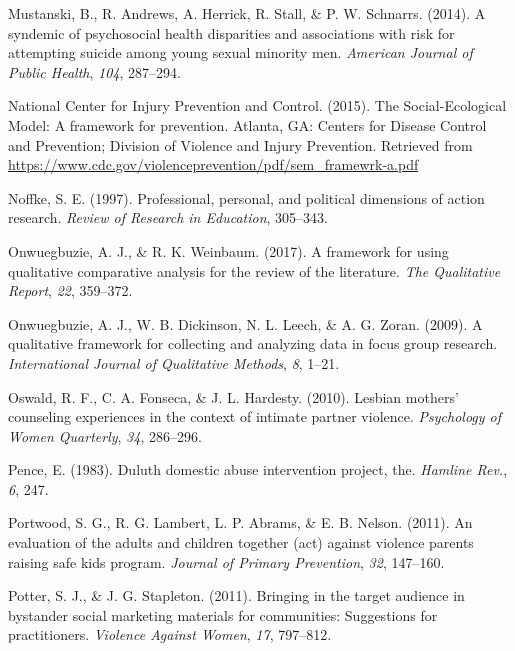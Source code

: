 \documentclass[11pt,]{tufte-book}
\begin{document}
\hypertarget{ref-mustanski2014syndemic}{}
Mustanski, B., R. Andrews, A. Herrick, R. Stall, \& P. W. Schnarrs.
(2014). A syndemic of psychosocial health disparities and associations
with risk for attempting suicide among young sexual minority men.
\emph{American Journal of Public Health}, \emph{104}, 287--294.

\hypertarget{ref-centers2015social}{}
National Center for Injury Prevention and Control. (2015). The
Social-Ecological Model: A framework for prevention. Atlanta, GA:
Centers for Disease Control and Prevention; Division of Violence and
Injury Prevention. Retrieved from
\url{https://www.cdc.gov/violenceprevention/pdf/sem_framewrk-a.pdf}

\hypertarget{ref-noffke1997professional}{}
Noffke, S. E. (1997). Professional, personal, and political dimensions
of action research. \emph{Review of Research in Education}, 305--343.

\hypertarget{ref-onwuegbuzie2017framework}{}
Onwuegbuzie, A. J., \& R. K. Weinbaum. (2017). A framework for using
qualitative comparative analysis for the review of the literature.
\emph{The Qualitative Report}, \emph{22}, 359--372.

\hypertarget{ref-onwuegbuzie2009qualitative}{}
Onwuegbuzie, A. J., W. B. Dickinson, N. L. Leech, \& A. G. Zoran.
(2009). A qualitative framework for collecting and analyzing data in
focus group research. \emph{International Journal of Qualitative
Methods}, \emph{8}, 1--21.

\hypertarget{ref-oswald2010lesbian}{}
Oswald, R. F., C. A. Fonseca, \& J. L. Hardesty. (2010). Lesbian
mothers' counseling experiences in the context of intimate partner
violence. \emph{Psychology of Women Quarterly}, \emph{34}, 286--296.

\hypertarget{ref-pence1983duluth}{}
Pence, E. (1983). Duluth domestic abuse intervention project, the.
\emph{Hamline Rev.}, \emph{6}, 247.

\hypertarget{ref-portwood2011evaluation}{}
Portwood, S. G., R. G. Lambert, L. P. Abrams, \& E. B. Nelson. (2011).
An evaluation of the adults and children together (act) against violence
parents raising safe kids program. \emph{Journal of Primary Prevention},
\emph{32}, 147--160.

\hypertarget{ref-potter2011bringing}{}
Potter, S. J., \& J. G. Stapleton. (2011). Bringing in the target
audience in bystander social marketing materials for communities:
Suggestions for practitioners. \emph{Violence Against Women}, \emph{17},
797--812.
\end{document}
